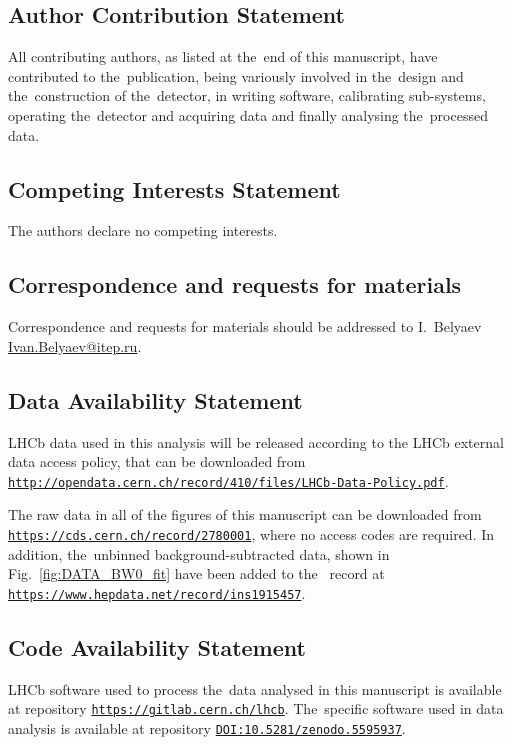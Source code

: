 \documentclass[12pt,a4paper]{article}
\begin{document}
 













\subsection*{Author Contribution Statement} 
All contributing authors, as listed at the~end of
this manuscript, 
have contributed to the~publication, 
being variously involved in the~design 
and the~construction of the~detector, 
in writing software, calibrating sub-systems, 
operating the~detector and acquiring data 
and finally analysing the~processed data.


\subsection*{Competing Interests Statement}
The authors declare no competing interests.

\subsection*{Correspondence and requests for materials}
Correspondence and requests for materials
should be addressed to I.~Belyaev \href{mailto:Ivan.Belyaev@itep.ru}{Ivan.Belyaev@itep.ru}.


\subsection*{Data Availability Statement} 

LHCb data used in this analysis will be released according to the LHCb external data access
policy, that can be downloaded from 
\href{http://opendata.cern.ch/record/410/files/LHCb-Data-Policy.pdf}
    {\tt{http://opendata.cern.ch/record/410/files/LHCb-Data-Policy.pdf}}.
    
The raw data in all of the figures of this manuscript
can be downloaded from 
\href{https://cds.cern.ch/record/2780001}{\tt{https://cds.cern.ch/record/2780001}},
where no access codes are required. In addition, 
the~unbinned background\nobreakdash-subtracted data, 
shown in Fig.~\ref{fig:DATA_BW0_fit}
have been added to the~{} record at
\href{https://www.hepdata.net/record/ins1915457} 
{\tt{https://www.hepdata.net/record/ins1915457}}.  


\subsection*{Code Availability Statement} 
LHCb software used to process the~data analysed in this manuscript 
is available at {} repository 
\href{https://gitlab.cern.ch/lhcb}{\tt{https://gitlab.cern.ch/lhcb}}.
The~specific software used in data analysis 
is available at {} repository
\href{https://zenodo.org/record/5595937}{\tt{DOI:10.5281/zenodo.5595937}}.
\end{document}
